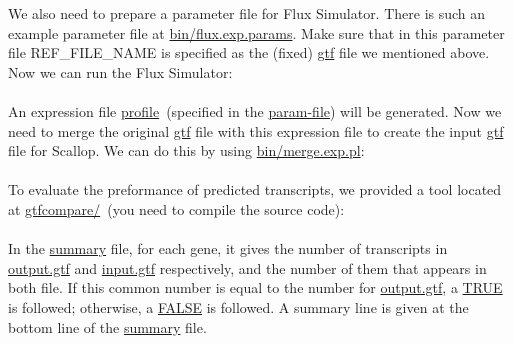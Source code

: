 \documentclass{llncs}
\begin{document}
We also need to prepare a parameter file for Flux Simulator. There is such an example
parameter file at \url{bin/flux.exp.params}. Make sure that in this parameter file
REF\_FILE\_NAME is specified as the (fixed) \url{gtf} file we mentioned above.
Now we can run the Flux Simulator:\\
\\

An expression file \url{profile}~(specified in the \url{param-file}) will be generated.
Now we need to merge the original \url{gtf} file with this expression file to create
the input \url{gtf} file for Scallop. We can do this by using \url{bin/merge.exp.pl}:\\
\\

To evaluate the preformance of predicted transcripts, we provided a tool
located at \url{gtfcompare/}~(you need to compile the source code):\\
\\

In the \url{summary} file, for each gene, it gives the number of transcripts in \url{output.gtf}
and \url{input.gtf} respectively, and the number of them that appears in both file.
If this common number is equal to the number for \url{output.gtf}, a \url{TRUE} is followed;
otherwise, a \url{FALSE} is followed. A summary line is given at the bottom line
of the \url{summary} file.
\end{document}
